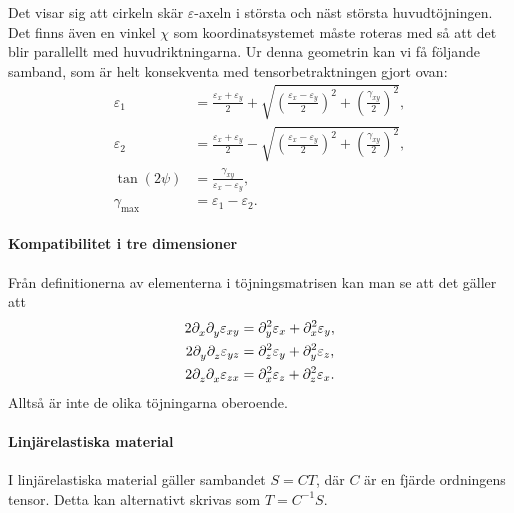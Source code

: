 Det visar sig att cirkeln skär $\varepsilon$-axeln i största och näst största huvudtöjningen. Det finns även en vinkel $\chi$ som koordinatsystemet måste roteras med så att det blir parallellt med huvudriktningarna. Ur denna geometrin kan vi få följande samband, som är helt konsekventa med tensorbetraktningen gjort ovan:
\begin{align*}
	\varepsilon_{1}     &= \frac{\varepsilon_{x} + \varepsilon_{y}}{2} + \sqrt{\left(\frac{\varepsilon_{x} - \varepsilon_{y}}{2}\right)^{2} + \left(\frac{\gamma_{xy}}{2}\right)^{2}}, \\
	\varepsilon_{2}     &= \frac{\varepsilon_{x} + \varepsilon_{y}}{2} - \sqrt{\left(\frac{\varepsilon_{x} - \varepsilon_{y}}{2}\right)^{2} + \left(\frac{\gamma_{xy}}{2}\right)^{2}}, \\
	\tan(2\psi)         &= \frac{\gamma_{xy}}{\varepsilon_{x} - \varepsilon_{y}}, \\
	\gamma_{\text{max}} &= \varepsilon_{1} - \varepsilon_{2}.
\end{align*}

\paragraph{Kompatibilitet i tre dimensioner}
Från definitionerna av elementerna i töjningsmatrisen kan man se att det gäller att
\begin{align*}
	2\del{x}{\del{y}{\varepsilon_{xy}}} &= \del[2]{y}{\varepsilon_{x}} + \del[2]{x}{\varepsilon_{y}}, \\
	2\del{y}{\del{z}{\varepsilon_{yz}}} &= \del[2]{z}{\varepsilon_{y}} + \del[2]{y}{\varepsilon_{z}}, \\
	2\del{z}{\del{x}{\varepsilon_{zx}}} &= \del[2]{x}{\varepsilon_{z}} + \del[2]{z}{\varepsilon_{x}}.
\end{align*}
Alltså är inte de olika töjningarna oberoende.

\paragraph{Linjärelastiska material}
I linjärelastiska material gäller sambandet $S = CT$, där $C$ är en fjärde ordningens tensor. Detta kan alternativt skrivas som $T = C^{-1}S$.

